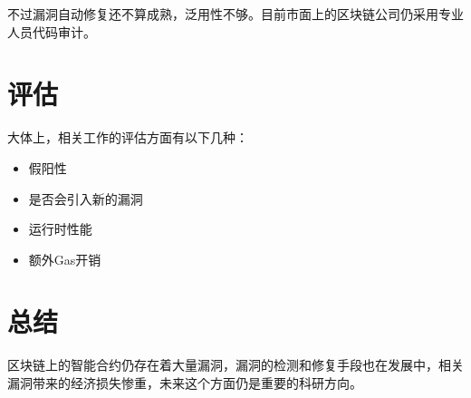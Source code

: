 \documentclass{SCIS2022cn}
\begin{document}
不过漏洞自动修复还不算成熟，泛用性不够。目前市面上的区块链公司仍采用专业人员代码审计。

\section{评估}

大体上，相关工作的评估方面有以下几种：

\begin{itemize}
    \item 假阳性
    \item 是否会引入新的漏洞
    \item 运行时性能
    \item 额外Gas开销
\end{itemize}

\section{总结}

区块链上的智能合约仍存在着大量漏洞，漏洞的检测和修复手段也在发展中，相关漏洞带来的经济损失惨重，未来这个方面仍是重要的科研方向。


\newpage
\end{document}
